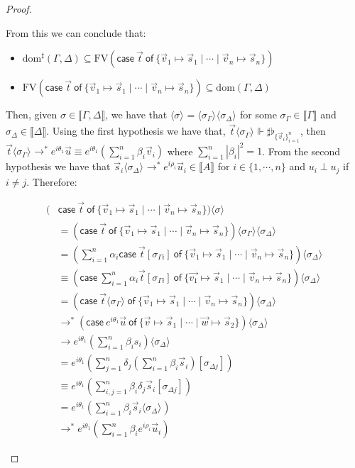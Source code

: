 \documentclass[a4paper,UKenglish,numberwithinsect,pdfa,anonymous]{lipics-v2021}
\theoremstyle{restatestyle}
\newcommand\lra{\longrightarrow}
\newcommand\ansubst[2]{\ensuremath{\langle #1 \rangle_{#2}}}
\newcommand\dom[1]{\mathrm{dom}(#1)}
\newcommand\sdom[1]{\mathrm{dom}^{\sharp}(#1)}
\newcommand\FV[1]{\mathrm{FV}(#1)}
\def\gencase#1#2#3#4#5{\ensuremath{\mathsf{case}~#1~\mathsf{of}~\{#2\mapsto #4 \mid \dotsb \mid #3\mapsto #5\}}}
\def\eval{\lra^*}
\def\sem#1{\llbracket#1\rrbracket}
\def\real{\Vdash}
\newcommand\basis[1]{\ensuremath{\flat_{#1}}}
\newcommand\genbasis[3]{\ensuremath{\basis{\{#1\}_{#2}^{#3}}}}
\begin{document}
\begin{proof}
\begin{description}
    From this we can conclude that:
    
    \begin{itemize}
        \item $\sdom{\Gamma,\Delta}\subseteq \FV{\gencase{\vec{t}}{\vec{v}_{1}}{\vec{v}_{n}}{\vec{s}_{1}}{\vec{s}_{n}}}$
        \item $\FV{\gencase{\vec{t}}{\vec{v}_{1}}{\vec{v}_{n}}{\vec{s}_{1}}{\vec{s}_{n}}}\subseteq \dom{\Gamma,\Delta}$
    \end{itemize}
    
    Then, given $\sigma\in\sem{\Gamma,\Delta}$, we have that $\ansubst{\sigma}{}=\ansubst{\sigma_\Gamma}{}\ansubst{\sigma_\Delta}{}$ for some $\sigma_\Gamma\in\sem{\Gamma}$ and $\sigma_\Delta\in\sem{\Delta}$. Using the first hypothesis we have that, $\vec{t}\ansubst{\sigma_\Gamma}{}\real\sharp\genbasis{\vec{v}_{i}}{i=1}{n}$, then $\vec{t}\ansubst{\sigma_\Gamma}{}\eval e^{i\theta_1} \vec{u}\equiv e^{i\theta_1} (\sum_{i=1}^{n}\beta_i \vec{v}_{i})$ where $\sum_{i=1}^{n}|\beta_i|^2=1$. From the second hypothesis we have that $\vec{s}_{i}\ansubst{\sigma_\Delta}{}\eval e^{i\rho_i} \vec{u}_{i}\in\sem{A}$ for $i\in\{1,\dotsb ,n\}$ and $u_i\perp u_j$ if $i\neq j$. Therefore:

    \begin{align*}
        (&\gencase{\vec{t}}{\vec{v}_{1}}{\vec{v}_{n}}{\vec{s}_{1}}{\vec{s}_{n}})\ansubst{\sigma}{}\\ 
        &= (\gencase{\vec{t}}{\vec{v}_{1}}{\vec{v}_{n}}{\vec{s}_{1}}{\vec{s}_{n}})\ansubst{\sigma_\Gamma}{}\ansubst{\sigma_\Delta}{}\\
        &=(\sum_{i=1}^{n}\alpha_i \gencase{\vec{t}[\sigma_{\Gamma i}]}{\vec{v}_{1}}{\vec{v}_{n}}{\vec{s}_{1}}{\vec{s}_{n}})\ansubst{\sigma_\Delta}{} \\
        &\equiv (\gencase{\sum_{i=1}^{n} \alpha_i \vec{t}[\sigma_{\Gamma i}]}{\vec {v_1}}{\vec{v}_{n}}{\vec{s}_{1}}{\vec{s}_{n}})\ansubst{\sigma_\Delta}{}\\
        &=(\gencase{\vec{t}\ansubst{\sigma_\Gamma}{}}{\vec{v}_{1}}{\vec{v}_{n}}{\vec{s}_{1}}{\vec{s}_{n}})\ansubst{\sigma_\Delta}{}\\
        &\eval(\gencase{e^{i\theta_1} \vec{u}}{\vec{v}}{\vec{w}}{\vec{s}_{1}}{\vec{s}_{2}})\ansubst{\sigma_\Delta}{}\\
        &\lra e^{i\theta_1} (\sum_{i=1}^{n}\beta_i s_i)\ansubst{\sigma_\Delta}{}\\
        &= e^{i\theta_1} (\sum_{j=1}^{n}\delta_j (\sum_{i=1}^{n}\beta_i \vec{s}_{i})[\sigma_{\Delta j}])\\
        &\equiv e^{i\theta_1} (\sum_{i,j=1}^{n}\beta_i\delta_j\vec{s}_{i}[\sigma_{\Delta j}])\\
        &= e^{i\theta_1} (\sum_{i=1}^{n}\beta_i \vec{s}_{i}\ansubst{\sigma_\Delta}{})\\
        &\eval e^{i\theta_1} (\sum_{i=1}^{n}\beta_i e^{i\rho_i} \vec{u}_{i})
    \end{align*}
    

\end{description}
\end{proof}
\end{document}
